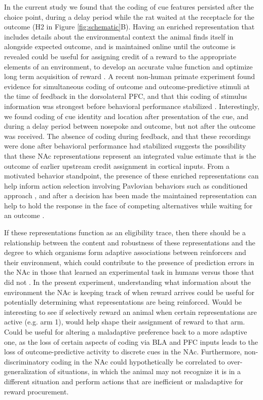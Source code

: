\documentclass[11pt]{article}
\let\cite=\citep
\begin{document}
{In the current study we found that the coding of cue features
persisted after the choice point, during a delay period while the rat
waited at the receptacle for the outcome (H2 in Figure
\ref{fig:schematic}B). Having an enriched representation that includes
details about the environmental context the animal finds itself in
alongside expected outcome, and is maintained online until the outcome
is revealed could be useful for assigning credit of a reward to the
appropriate elements of an environment, to develop an accurate value
function and optimize long term acquisition of reward
\cite{Lee2012}. A recent non-human primate experiment found evidence
for simultaneous coding of outcome and outcome-predictive stimuli at
the time of feedback in the dorsolateral PFC, and that this coding of
stimulus information was strongest before behavioral performance
stabilized \cite{Asaad2017}. Interestingly, we found coding of cue
identity and location after presentation of the cue, and during a
delay period between nosepoke and outcome, but not after the outcome
was received. The absence of coding during feedback, and that these
recordings were done after behavioral performance had stabilized
suggests the possibility that these NAc representations represent an
integrated value estimate that is the outcome of earlier upstream
credit assignment in cortical inputs. From a motivated behavior
standpoint, the presence of these enriched representations can help
inform action selection involving Pavlovian behaviors such as
conditioned approach \cite{DiCiano2001,Parkinson2000,Saunders2012},
and after a decision has been made the maintained representation can
help to hold the response in the face of competing alternatives while
waiting for an outcome
\cite{DiCiano2008,Floresco2008,Floresco2015,Peters2008}.

If these representations function as an eligibility trace, then there
should be a relationship between the content and robustness of these
representations and the degree to which organisms form adaptive
associations between reinforcers and their environment, which could
contribute to the presence of prediction errors in the NAc in those
that learned an experimental task in humans versus those that did not
\cite{Schonberg2007}. In the present experiment, understanding what
information about the environment the NAc is keeping track of when
reward arrives could be useful for potentially determining what
representations are being reinforced. Would be interesting to see if
selectively reward an animal when certain representations are active
(e.g. arm 1), would help shape their assignment of reward to that
arm. Could be useful for altering a maladaptive preference back to a
more adaptive one, as the loss of certain aspects of coding via BLA
and PFC inputs leads to the loss of outcome-predictive activity to
discrete cues in the NAc. Furthermore, non-discriminatory coding in
the NAc could hypothetically be correlated to over-generalization of
situations, in which the animal may not recognize it is in a different
situation and perform actions that are inefficient or maladaptive for
reward procurement.

}
\end{document}
